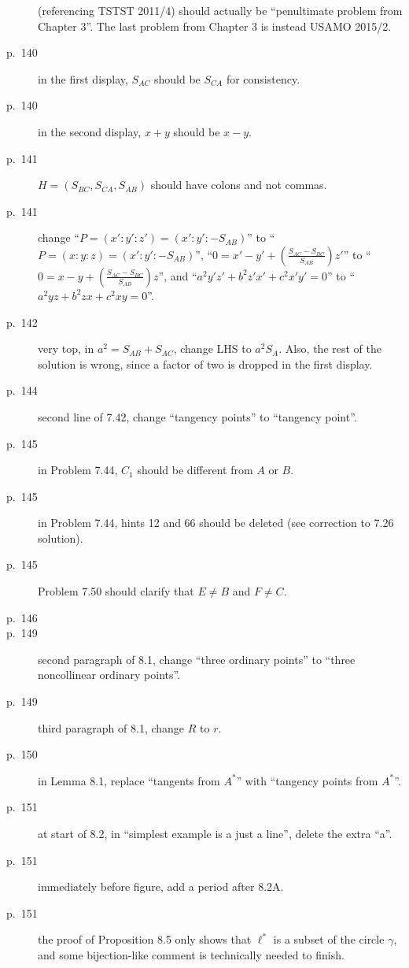 \documentclass[11pt]{scrartcl}
\begin{document}
\begin{description}
  (referencing TSTST 2011/4) should actually be ``penultimate problem from Chapter 3''.
  The last problem from Chapter 3 is instead USAMO 2015/2.
\item[p.\  140] in the first display, $S_{AC}$ should be $S_{CA}$ for consistency.
\item[p.\  140] in the second display, $x+y$ should be $x-y$.
\item[p.\  141] $H = (S_{BC},S_{CA},S_{AB})$ should have
  colons and not commas.
\item[p.\  141] change ``$P = \left(x' : y' : z'\right) = \left(x' : y' : -S_{AB}\right)$''
  to ``$P = \left(x : y : z\right) = \left(x' : y' : -S_{AB}\right)$'',
  ``$0 = x' - y' + \left( \frac{S_{AC}-S_{BC}}{S_{AB}} \right) z'$''
  to ``$0 = x - y + \left( \frac{S_{AC}-S_{BC}}{S_{AB}} \right) z$'',
  and ``$a^2 y'z' + b^2 z'x' + c^2 x'y' = 0$''
  to ``$a^2 yz + b^2 zx + c^2 xy = 0$''.
\item[p.\  142] very top, in $a^2=S_{AB}+S_{AC}$, change LHS to $a^2S_A$.
  Also, the rest of the solution is wrong, since a factor of two is dropped in the first display.
\item[p.\  144] second line of 7.42, change ``tangency points'' to ``tangency point''.
\item[p.\  145] in Problem 7.44, $C_1$ should be different from $A$ or $B$.
\item[p.\  145] in Problem 7.44, hints 12 and 66 should be deleted (see correction to 7.26
  solution).
\item[p.\  145] Problem 7.50 should clarify that $E \neq B$ and $F \neq C$.
\item[p.\  146] 
\item[p.\  149] second paragraph of 8.1, change ``three ordinary points''
  to ``three noncollinear ordinary points''.
\item[p.\  149] third paragraph of 8.1, change $R$ to $r$.
\item[p.\  150] in Lemma 8.1, replace ``tangents from $A^\ast$'' with ``tangency points from $A^\ast$''.
\item[p.\  151] at start of 8.2, in ``simplest example is a just a line'', delete the extra ``a''.
\item[p.\  151] immediately before figure, add a period after 8.2A.
\item[p.\  151] the proof of Proposition 8.5 only shows that $\ell^\ast$ is a subset of the circle
  $\gamma$, and some bijection-like comment is technically needed to finish.

\end{description}
\end{document}
